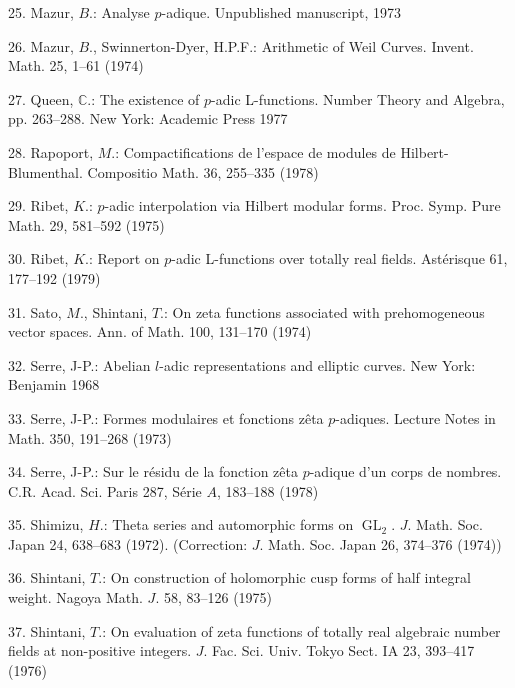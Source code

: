 \documentclass[11pt]{article}
\begin{document}
\par
25. Mazur, \(B\).: Analyse \(p\)-adique. Unpublished manuscript, 1973\par
\par
26. Mazur, \(B\)., Swinnerton-Dyer, H.P.F.: Arithmetic of Weil Curves. Invent. Math. 25, 1--61 (1974)\par
\par
27. Queen, \(\mathbb{C}\).: The existence of \(p\)-adic L-functions. Number Theory and Algebra, pp. 263--288. New York: Academic Press 1977\par
\par
28. Rapoport, \(M\).: Compactifications de l’espace de modules de Hilbert-Blumenthal. Compositio Math. 36, 255--335 (1978)\par
\par
29. Ribet, \(K\).: \(p\)-adic interpolation via Hilbert modular forms. Proc. Symp. Pure Math. 29, 581--592 (1975)\par
\par
30. Ribet, \(K\).: Report on \(p\)-adic L-functions over totally real fields. Astérisque 61, 177--192 (1979)\par
\par
31. Sato, \(M\)., Shintani, \(T\).: On zeta functions associated with prehomogeneous vector spaces. Ann. of Math. 100, 131--170 (1974)\par
\par
32. Serre, J-P.: Abelian \(l\)-adic representations and elliptic curves. New York: Benjamin 1968\par
\par
33. Serre, J-P.: Formes modulaires et fonctions zêta \(p\)-adiques. Lecture Notes in Math. 350, 191--268 (1973)\par
\par
34. Serre, J-P.: Sur le résidu de la fonction zêta \(p\)-adique d’un corps de nombres. C.R. Acad. Sci. Paris 287, Série \(A\), 183--188 (1978)\par
\par
35. Shimizu, \(H\).: Theta series and automorphic forms on \(\operatorname{GL}_{2}\). \(J\). Math. Soc. Japan 24, 638--683 (1972). (Correction: \(J\). Math. Soc. Japan 26, 374--376 (1974))\par
\par
36. Shintani, \(T\).: On construction of holomorphic cusp forms of half integral weight. Nagoya Math. \(J\). 58, 83--126 (1975)\par
\par
37. Shintani, \(T\).: On evaluation of zeta functions of totally real algebraic number fields at non-positive integers. \(J\). Fac. Sci. Univ. Tokyo Sect. IA 23, 393--417 (1976)\par
\end{document}

